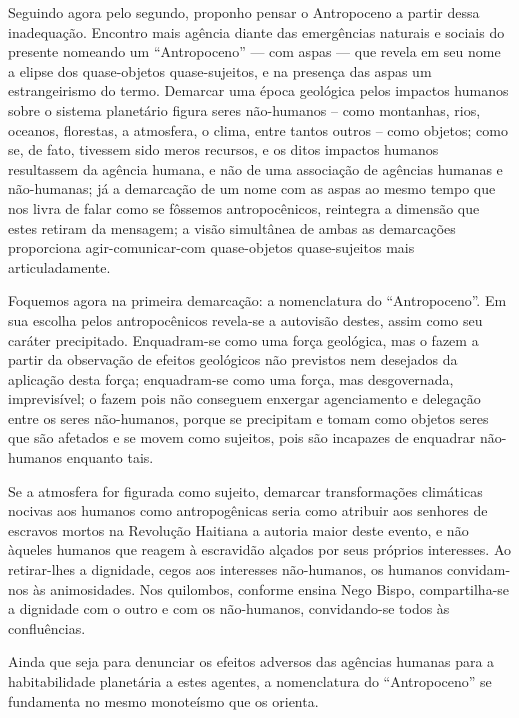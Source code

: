 Seguindo agora pelo segundo, proponho pensar o Antropoceno a partir dessa inadequação. Encontro mais agência diante das emergências naturais e sociais do presente nomeando um \enquote{Antropoceno} --- com aspas --- que revela em seu nome a elipse dos quase-objetos quase-sujeitos, e na presença das aspas um estrangeirismo do termo. Demarcar uma época geológica pelos impactos humanos sobre o sistema planetário figura seres não-humanos -- como montanhas, rios, oceanos, florestas, a atmosfera, o clima, entre tantos outros -- como objetos; como se, de fato, tivessem sido meros recursos, e os ditos impactos humanos resultassem da agência humana, e não de uma associação de agências humanas e não-humanas; já a demarcação de um nome com as aspas ao mesmo tempo que nos livra de falar como se fôssemos antropocênicos, reintegra a dimensão que estes retiram da mensagem; a visão simultânea de ambas as demarcações proporciona agir-comunicar-com quase-objetos quase-sujeitos  mais articuladamente.

Foquemos agora na primeira demarcação: a nomenclatura do \enquote{Antropoceno}. Em sua escolha pelos antropocênicos revela-se a autovisão destes, assim como seu caráter precipitado. Enquadram-se como uma força geológica, mas o fazem a partir da observação de efeitos geológicos não previstos nem desejados da aplicação desta força; enquadram-se como uma força,  mas desgovernada, imprevisível; o fazem pois não conseguem enxergar agenciamento e delegação entre os seres não-humanos, porque se precipitam e tomam como objetos seres que são afetados e se movem como sujeitos, pois são incapazes de enquadrar não-humanos enquanto tais.

Se a atmosfera for figurada como sujeito, demarcar  transformações climáticas nocivas aos humanos como  antropogênicas seria como atribuir aos senhores de escravos mortos na Revolução Haitiana a autoria maior deste evento, e não àqueles humanos que reagem à escravidão alçados por seus próprios interesses. Ao retirar-lhes a dignidade, cegos aos interesses não-humanos, os humanos convidam-nos às animosidades. Nos quilombos, conforme ensina Nego Bispo, compartilha-se a dignidade com o outro e com os não-humanos, convidando-se todos às confluências.

Ainda que seja para denunciar os efeitos adversos das agências humanas para a habitabilidade planetária a estes agentes, a nomenclatura do \enquote{Antropoceno} se fundamenta no mesmo monoteísmo que os orienta.

